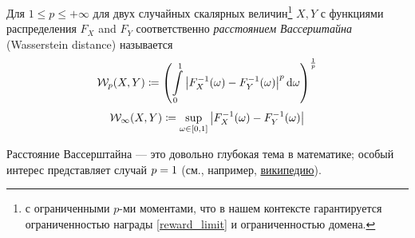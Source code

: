 \begin{definition}
Для $1 \le p \le +\infty$ для двух случайных скалярных величин\footnote{с ограниченными $p$-ми моментами, что в нашем контексте гарантируется ограниченностью награды \eqref{reward_limit} и ограниченностью домена.} $X, Y$ с функциями распределения $F_X$ and $F_Y$ соответственно \emph{расстоянием Вассерштайна} (Wasserstein distance) называется
\begin{equation}\label{wasserstein}
    \mathcal{W}_p(X, Y) \coloneqq \left( \int\limits_0^1 \left| F_X^{-1}(\omega) - F_Y^{-1}(\omega) \right| ^p \mathop{}\!\mathrm{d} \omega \right)^{\frac{1}{p}}
\end{equation}
$$\mathcal{W}_\infty(X, Y) \coloneqq \sup_{\omega \in [0,1]} \left| F_X^{-1}(\omega) - F_Y^{-1}(\omega) \right| $$
\end{definition}

Расстояние Вассерштайна --- это довольно глубокая тема в математике; особый интерес представляет случай $p \HM= 1$ (см., например, \href{https://en.wikipedia.org/wiki/Wasserstein_metric}{википедию}). 

